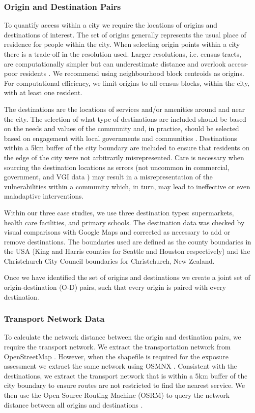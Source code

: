 \documentclass[review,3p,times,onecolumn,sort&compress,12pt]{elsarticle}
\let \cite \parencite
\begin{document}
\subsubsection{Origin and Destination Pairs}
To quantify access within a city we require the locations of origins and destinations of interest.
The set of origins generally represents the usual place of residence for people within the city.
When selecting origin points within a city there is a trade-off in the resolution used. 
Larger resolutions, i.e. census tracts, are computationally simpler but can underestimate distance and overlook access-poor residents \cite{logan2019evaluating}. 
We recommend using neighbourhood block centroids as origins. 
For computational efficiency, we limit origins to all census blocks, within the city, with at least one resident.

The destinations are the locations of services and/or amenities around and near the city. 
The selection of what type of destinations are included should be based on the needs and values of the community and, in practice, should be selected based on engagement with local governments and communities \cite{Simonsen2012-bj}.
Destinations within a 5km buffer of the city boundary are included to ensure that residents on the edge of the city were not arbitrarily misrepresented.
Care is necessary when sourcing the destination locations as errors (not uncommon in commercial, government, and VGI data \cite{Wong2017-it}) may result in a misrepresentation of the vulnerabilities within a community which, in turn, may lead to ineffective or even maladaptive interventions. 

Within our three case studies, we use three destination types: supermarkets, health care facilities, and primary schools.
The destination data was checked by visual comparisons with Google Maps and corrected as necessary to add or remove destinations.
The boundaries used are defined as the county boundaries in the USA (King and Harris counties for Seattle and Houston respectively) and the Christchurch City Council boundaries for Christchurch, New Zealand.

Once we have identified the set of origins and destinations we create a joint set of origin-destination (O-D) pairs, such that every origin is paired with every destination.

\subsubsection{Transport Network Data}
To calculate the network distance between the origin and destination pairs, we require the transport network.
We extract the transportation network from OpenStreetMap \cite{OpenStreetMap}.
However, when the shapefile is required for the exposure assessment we extract the same network using OSMNX \cite{Boeing2017-nf}. 
Consistent with the destinations, we extract the transport network that is within a 5km buffer of the city boundary to ensure routes are not restricted to find the nearest service.
We then use the Open Source Routing Machine (OSRM) to query the network distance between all origins and destinations \cite{luxen-vetter-2011}. 
\end{document}
